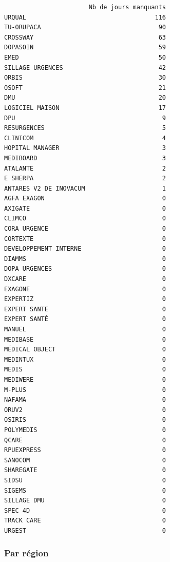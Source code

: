 \documentclass[]{article}
\begin{document}
\begin{verbatim}
                       Nb de jours manquants
URQUAL                                   116
TU-ORUPACA                                90
CROSSWAY                                  63
DOPASOIN                                  59
EMED                                      50
SILLAGE URGENCES                          42
ORBIS                                     30
OSOFT                                     21
DMU                                       20
LOGICIEL MAISON                           17
DPU                                        9
RESURGENCES                                5
CLINICOM                                   4
HOPITAL MANAGER                            3
MEDIBOARD                                  3
ATALANTE                                   2
E SHERPA                                   2
ANTARES V2 DE INOVACUM                     1
AGFA EXAGON                                0
AXIGATE                                    0
CLIMCO                                     0
CORA URGENCE                               0
CORTEXTE                                   0
DEVELOPPEMENT INTERNE                      0
DIAMMS                                     0
DOPA URGENCES                              0
DXCARE                                     0
EXAGONE                                    0
EXPERTIZ                                   0
EXPERT SANTE                               0
EXPERT SANTÉ                               0
MANUEL                                     0
MEDIBASE                                   0
MÉDICAL OBJECT                             0
MEDINTUX                                   0
MEDIS                                      0
MEDIWERE                                   0
M-PLUS                                     0
NAFAMA                                     0
ORUV2                                      0
OSIRIS                                     0
POLYMEDIS                                  0
QCARE                                      0
RPUEXPRESS                                 0
SANOCOM                                    0
SHAREGATE                                  0
SIDSU                                      0
SIGEMS                                     0
SILLAGE DMU                                0
SPEC 4D                                    0
TRACK CARE                                 0
URGEST                                     0
\end{verbatim}

\subsubsection{Par région}\label{par-region}
\end{document}
